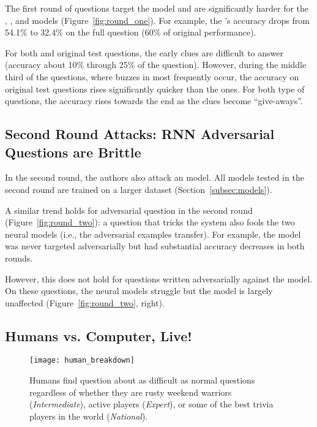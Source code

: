 The first round of \challenge{} questions target the  model
and are significantly harder for the ,
, and  models (Figure~\ref{fig:round_one}). For example,
the 's accuracy drops from 54.1\% to 32.4\% on the full question
 (60\% of original performance).

For both \challenge{} and original test questions, the early
clues are difficult to answer (accuracy about
10\% through 25\% of the question). However, during the middle third 
of the questions, where buzzes in \qb{} most
frequently occur, the accuracy on original test questions rises
significantly quicker than the \challenge{} ones. For both type of questions,
the accuracy rises towards the end as the clues become
``give-aways''.

 \subsection{Second Round Attacks: RNN Adversarial Questions are Brittle}\label{subsec:two}

In the second round, the authors also attack an  model.
All models tested in the second round are trained on a larger dataset (Section~\ref{subsec:models}).

A similar trend holds for  adversarial question
in the second round (Figure~\ref{fig:round_two}): a question that tricks the  system also fools
the two neural models (i.e., the adversarial examples transfer). For example, the  model
was never targeted adversarially but had substantial
accuracy decreases in both rounds.

However, this does not hold for questions written adversarially
against the  model. On these questions, the neural models
struggle but the 
 model is largely
unaffected (Figure~\ref{fig:round_two}, right).

\subsection{Humans vs. Computer, Live!}
\label{subsec:live}

\begin{figure*}
\centering
\texttt{[image: human\_breakdown]}
\caption{Humans find \challenge{} question about as difficult as
  normal questions regardless of whether they are rusty weekend
  warriors (\textit{Intermediate}), active players (\textit{Expert}), or
  some of the best trivia players in the world (\textit{National}).}
\label{fig:human_breakdown}
\end{figure*}

